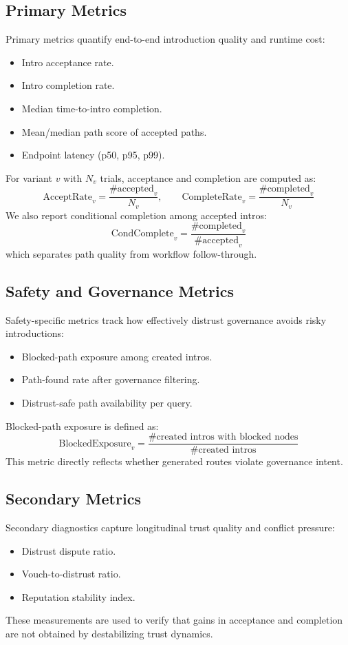 \documentclass[conference]{IEEEtran}
\begin{document}
\subsection{Primary Metrics}
Primary metrics quantify end-to-end introduction quality and runtime cost:
\begin{itemize}
    \item Intro acceptance rate.
    \item Intro completion rate.
    \item Median time-to-intro completion.
    \item Mean/median path score of accepted paths.
    \item Endpoint latency (p50, p95, p99).
\end{itemize}

For variant $v$ with $N_v$ trials, acceptance and completion are computed as:
\begin{equation}
\text{AcceptRate}_v=\frac{\#\text{accepted}_v}{N_v},\qquad
\text{CompleteRate}_v=\frac{\#\text{completed}_v}{N_v}
\end{equation}
We also report conditional completion among accepted intros:
\begin{equation}
\text{CondComplete}_v=\frac{\#\text{completed}_v}{\#\text{accepted}_v}
\end{equation}
which separates path quality from workflow follow-through.

\subsection{Safety and Governance Metrics}
Safety-specific metrics track how effectively distrust governance avoids risky introductions:
\begin{itemize}
    \item Blocked-path exposure among created intros.
    \item Path-found rate after governance filtering.
    \item Distrust-safe path availability per query.
\end{itemize}

Blocked-path exposure is defined as:
\begin{equation}
\text{BlockedExposure}_v=\frac{\#\text{created intros with blocked nodes}}{\#\text{created intros}}
\end{equation}
This metric directly reflects whether generated routes violate governance intent.

\subsection{Secondary Metrics}
Secondary diagnostics capture longitudinal trust quality and conflict pressure:
\begin{itemize}
    \item Distrust dispute ratio.
    \item Vouch-to-distrust ratio.
    \item Reputation stability index.
\end{itemize}
These measurements are used to verify that gains in acceptance and completion are not obtained by destabilizing trust dynamics.
\end{document}
